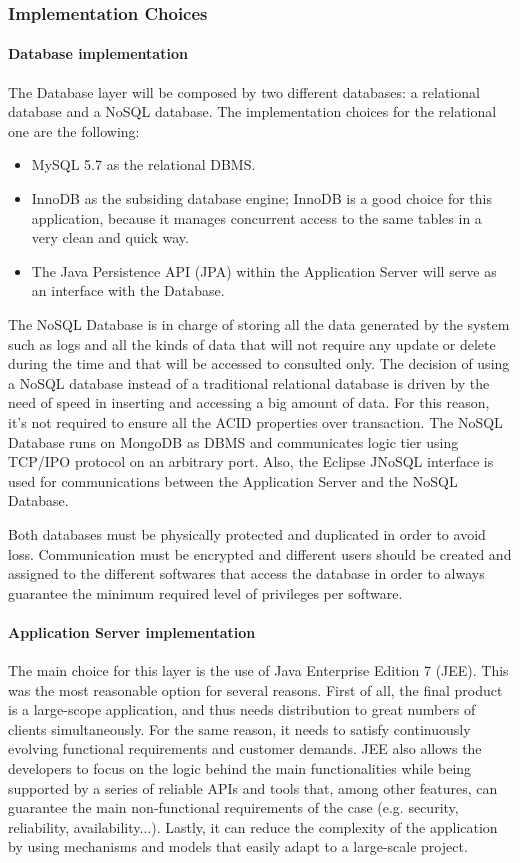 \subsubsection{Implementation Choices}
\paragraph{Database implementation}
The Database layer will be composed by two different databases: a relational database and a NoSQL database. The implementation choices for the relational one are the following:

\begin{itemize}
\item MySQL 5.7 as the relational DBMS.
\item InnoDB as the subsiding database engine; InnoDB is a good choice for this application, because it manages concurrent access to the same tables in a very clean and quick way.
\item The Java Persistence API (JPA) within the Application Server will serve as an interface with the Database.
\end{itemize}

The NoSQL Database is in charge of storing all the data generated by the system such as logs and all the kinds of data that  will not require any update or delete during the time and that will be accessed to consulted only. The decision of using a NoSQL database instead of a traditional relational database is driven by the need of speed in inserting and accessing a big amount of data. For this reason, it's not required to ensure all the ACID properties over transaction. The NoSQL Database runs on MongoDB as DBMS and communicates logic tier using TCP/IPO protocol on an arbitrary port. Also, the Eclipse JNoSQL interface is used for communications between the Application Server and the NoSQL Database.

Both databases must be physically protected and duplicated in order to avoid loss. Communication must be encrypted and different users should be created and assigned to the different softwares that access the database in order to always guarantee the minimum required level of privileges per software.

\paragraph{Application Server implementation}
The main choice for this layer is the use of Java Enterprise Edition 7 (JEE). This was the most reasonable option for several reasons. First of all, the final product is a large-scope application, and thus needs distribution to great numbers of clients simultaneously. For the same reason, it needs to satisfy continuously evolving functional requirements and customer demands. JEE also allows the developers to focus on the logic behind the main functionalities while being supported by a series of reliable APIs and tools that, among other features, can guarantee the main non-functional requirements of the case (e.g. security, reliability, availability...). Lastly, it can reduce the complexity of the application by using mechanisms and models that easily adapt to a large-scale project. 


